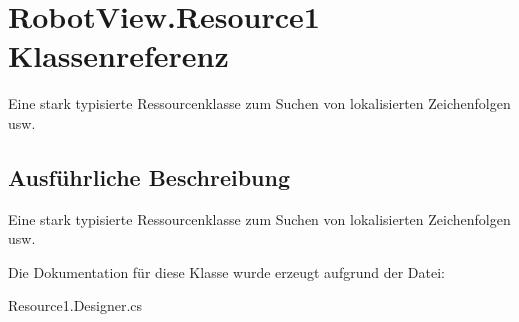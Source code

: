 \hypertarget{class_robot_view_1_1_resource1}{
\section{RobotView.Resource1 Klassenreferenz}
\label{class_robot_view_1_1_resource1}
}


Eine stark typisierte Ressourcenklasse zum Suchen von lokalisierten Zeichenfolgen usw.  




\subsection{Ausführliche Beschreibung}
Eine stark typisierte Ressourcenklasse zum Suchen von lokalisierten Zeichenfolgen usw. 

Die Dokumentation für diese Klasse wurde erzeugt aufgrund der Datei:\begin{DoxyCompactItemize}
\item 
Resource1.Designer.cs\end{DoxyCompactItemize}
